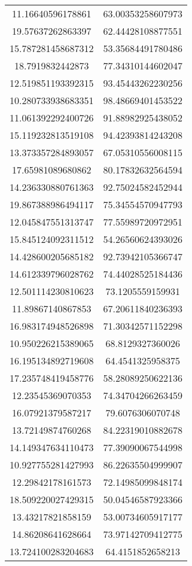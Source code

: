 \begin{table}
\begin{tabular}{cc}
11.16640596178861 & 63.00353258607973 \\
19.57637262863397 & 62.44428108877551 \\
15.787281458687312 & 53.35684491780486 \\
18.7919832442873 & 77.34310144602047 \\
12.519851193392315 & 93.45443262230256 \\
10.280733938683351 & 98.48669401453522 \\
11.061392292400726 & 91.88982925438052 \\
15.119232813519108 & 94.42393814243208 \\
13.373357284893057 & 67.05310556008115 \\
17.65981089680862 & 80.17832632564594 \\
14.236330880761363 & 92.75024582452944 \\
19.867388986494117 & 75.34554570947793 \\
12.045847551313747 & 77.55989720972951 \\
15.845124092311512 & 54.26560624393026 \\
14.428600205685182 & 92.73942105366747 \\
14.612339796028762 & 74.44028525184436 \\
12.501114230810623 & 73.1205559159931 \\
11.89867140867853 & 67.20611840236393 \\
16.983174948526898 & 71.30342571152298 \\
10.950226215389065 & 68.8129327360026 \\
16.195134892719608 & 64.4541325958375 \\
17.235748419458776 & 58.28089250622136 \\
12.23545369070353 & 74.34704266263459 \\
16.07921379587217 & 79.6076306070748 \\
13.72149874760268 & 84.22319010882678 \\
14.149347634110473 & 77.39090067544998 \\
10.927755281427993 & 86.22635504999907 \\
12.29842178161573 & 72.14985099848174 \\
18.509220027429315 & 50.04546587923366 \\
13.43217821858159 & 53.00734605917177 \\
14.86208641628664 & 73.97142709412775 \\
13.724100283204683 & 64.4151852658213 \\

\end{tabular}
\end{table}
